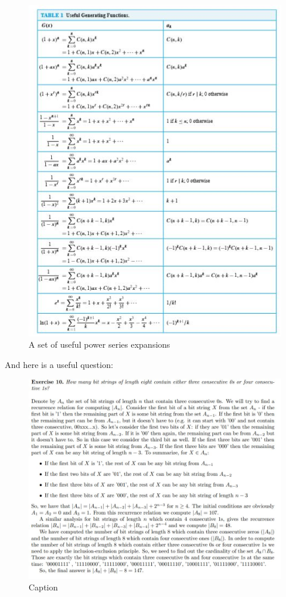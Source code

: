 \documentclass[titlepage]{article}
\theoremstyle{definition}
\numberwithin{equation}{subsection}
\numberwithin{remark}{subsection}
\begin{document}
\begin{figure}[H]
    \centering
    \includegraphics[scale = 1.15]{epflLectureNotes/advancedComputation/figures/powseries.JPG}
    \caption{A set of useful power series expansions}
    \label{fig:my_label}
\end{figure}
\clearpage

And here is a useful question:

\begin{figure}[H]
    \centering
    \includegraphics[scale = 0.6]{epflLectureNotes/advancedComputation/figures/prob.JPG}
    \caption{Caption}
    \label{fig:my_label}
\end{figure}
\end{document}
